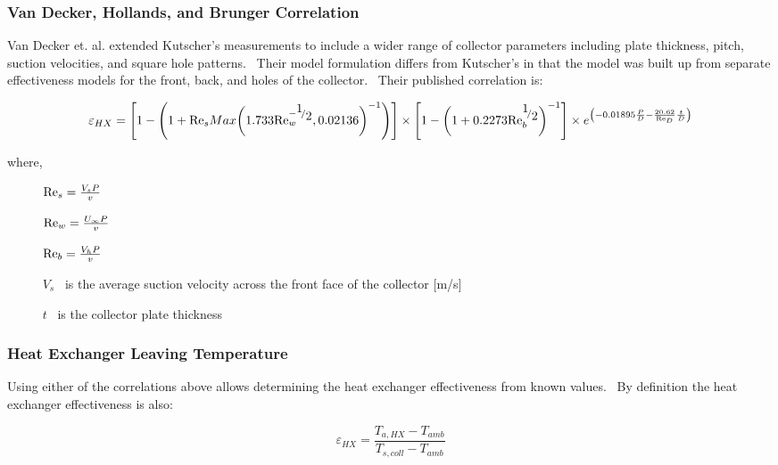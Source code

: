 \subsubsection{Van Decker, Hollands, and Brunger Correlation}\label{van-decker-hollands-and-brunger-correlation}

Van Decker et. al. extended Kutscher's measurements to include a wider range of collector parameters including plate thickness, pitch, suction velocities, and square hole patterns.~ Their model formulation differs from Kutscher's in that the model was built up from separate effectiveness models for the front, back, and holes of the collector.~ Their published correlation is:

\begin{equation}
{\varepsilon_{HX}} = \left[ {1 - \left( {1 + {{{\mathop{\rm Re}\nolimits} }_s}Max{{\left( {1.733{\mathop{\rm Re}\nolimits}_w^{ - {\raise0.7ex\hbox{1} \!\mathord{\left/ {\vphantom {1 2}}\right.}\!\lower0.7ex\hbox{2}}},0.02136} \right)}^{ - 1}}} \right)} \right] \times \left[ {1 - {{\left( {1 + 0.2273{\mathop{\rm Re}\nolimits}_b^{{\raise0.7ex\hbox{1} \!\mathord{\left/ {\vphantom {1 2}}\right.}\!\lower0.7ex\hbox{2}}}} \right)}^{ - 1}}} \right] \times {e^{\left( { - 0.01895\frac{P}{D} - \frac{{20.62}}{{{{{\mathop{\rm Re}\nolimits} }_D}}}\frac{t}{D}} \right)}}
\end{equation}

where,

~~~~~ \({{\mathop{\rm Re}\nolimits}_s} = \frac{{{V_s}P}}{v}\)

~~~~~ \({{\mathop{\rm Re}\nolimits}_w} = \frac{{{U_\infty }P}}{v}\)

~~~~~ \({{\mathop{\rm Re}\nolimits}_b} = \frac{{{V_h}P}}{v}\)

~~~~~ \({V_s}\) ~is the average suction velocity across the front face of the collector {[}m/s{]}

~~~~~ \(t\) ~is the collector plate thickness

\subsubsection{Heat Exchanger Leaving Temperature}\label{heat-exchanger-leaving-temperature}

Using either of the correlations above allows determining the heat exchanger effectiveness from known values.~ By definition the heat exchanger effectiveness is also:

\begin{equation}
{\varepsilon_{HX}} = \frac{{{T_{a,HX}} - {T_{amb}}}}{{{T_{s,coll}} - {T_{amb}}}}
\end{equation}

